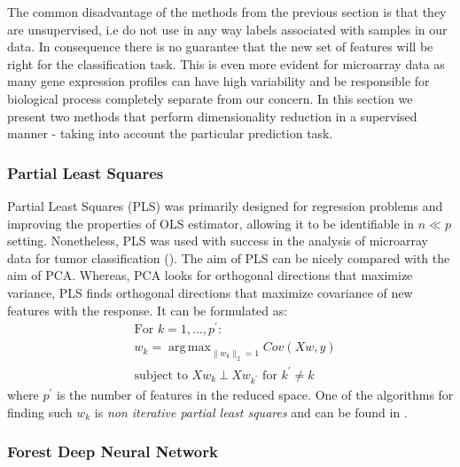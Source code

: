 \documentclass[shortabstract, english, mgr]{iithesis}
\DeclareMathOperator*{\argmax}{arg\,max}
\begin{document}
The common disadvantage of the methods from the previous section is that they are unsupervised, i.e do not use in any way labels associated with samples in our data. In consequence there is no guarantee that the new set of features will be right for the classification task. This is even more evident for microarray data as many gene expression profiles can have high variability and be responsible for biological process completely separate from our concern. In this section we present two methods that perform dimensionality reduction in a supervised manner - taking into account the particular prediction task. 

\subsubsection{Partial Least Squares}
Partial Least Squares (PLS) was primarily designed for regression problems and improving the properties of OLS estimator, allowing it to be identifiable in $n \ll p$ setting. Nonetheless, PLS was used with success in the analysis of microarray data for tumor classification (\cite{TumorPLS}). The aim of PLS can be nicely compared with the aim of PCA. Whereas, PCA looks for orthogonal directions that maximize variance, PLS finds orthogonal directions that maximize covariance of new features with the response. It can be formulated as:
\begin{align*}
& \text{For $k=1, \ldots, p^{\prime}$}: \\
& w_k = \argmax_{\|w_k\|_2 = 1} Cov \left(Xw,y\right) \\
&\text{subject to } Xw_k \ \bot \  Xw_{k^{\prime}} \text{ for } k^{\prime} \neq k  
\end{align*}
where $p^{\prime}$ is the number of features in the reduced space. One of the algorithms for finding such $w_k$ is \textit{non iterative partial least squares} and can be found in \cite[chapter 3.5.2]{ESL2}. 

\subsubsection{Forest Deep Neural Network}
\end{document}
